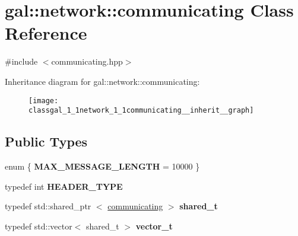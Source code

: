\hypertarget{classgal_1_1network_1_1communicating}{\section{gal\-:\-:network\-:\-:communicating \-Class \-Reference}
\label{classgal_1_1network_1_1communicating}
}


{\ttfamily \#include $<$communicating.\-hpp$>$}



\-Inheritance diagram for gal\-:\-:network\-:\-:communicating\-:\nopagebreak
\begin{figure}[H]
\begin{center}
\leavevmode
\texttt{[image: classgal\_1\_1network\_1\_1communicating\_\_inherit\_\_graph]}
\end{center}
\end{figure}
\subsection*{\-Public \-Types}
\begin{DoxyCompactItemize}
\item 
enum \{ {\bfseries \-M\-A\-X\-\_\-\-M\-E\-S\-S\-A\-G\-E\-\_\-\-L\-E\-N\-G\-T\-H} =  10000
 \}
\item 
\hypertarget{classgal_1_1network_1_1communicating_aef6c11aca9b227ec65e289b5f194cd83}{typedef int {\bfseries \-H\-E\-A\-D\-E\-R\-\_\-\-T\-Y\-P\-E}}\label{classgal_1_1network_1_1communicating_aef6c11aca9b227ec65e289b5f194cd83}

\item 
\hypertarget{classgal_1_1network_1_1communicating_a20c6f2dc53a296b6b34a82d5dc8f894a}{typedef std\-::shared\-\_\-ptr\*
$<$ \hyperlink{classgal_1_1network_1_1communicating}{communicating} $>$ {\bfseries shared\-\_\-t}}\label{classgal_1_1network_1_1communicating_a20c6f2dc53a296b6b34a82d5dc8f894a}

\item 
\hypertarget{classgal_1_1network_1_1communicating_acde720b70acbd7aecc86d2ebd4d91113}{typedef std\-::vector$<$ shared\-\_\-t $>$ {\bfseries vector\-\_\-t}}\label{classgal_1_1network_1_1communicating_acde720b70acbd7aecc86d2ebd4d91113}

\end{DoxyCompactItemize}
